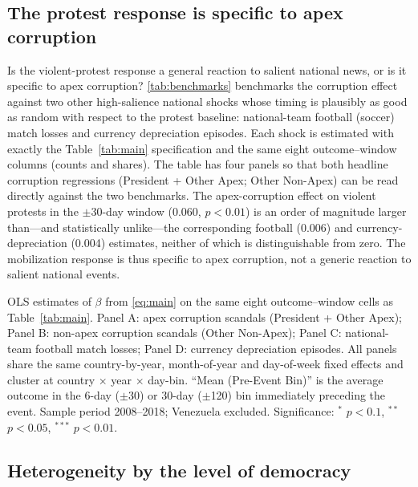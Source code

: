 \documentclass[11pt]{article}
\let\mathbetasym\beta
\renewcommand{\beta}{\ensuremath{\mathbetasym}}
\begin{document}
\subsection{The protest response is specific to apex corruption}

Is the violent-protest response a general reaction to salient national news, or is it specific to apex corruption? \autoref{tab:benchmarks} benchmarks the corruption effect against two other high-salience national shocks whose timing is plausibly as good as random with respect to the protest baseline: national-team football (soccer) match losses and currency depreciation episodes. Each shock is estimated with exactly the Table~\ref{tab:main} specification and the same eight outcome--window columns (counts and shares). The table has four panels so that both headline corruption regressions (President + Other Apex; Other Non-Apex) can be read directly against the two benchmarks. The apex-corruption effect on violent protests in the $\pm$30-day window (0.060, $p<0.01$) is an order of magnitude larger than---and statistically unlike---the corresponding football (0.006) and currency-depreciation (0.004) estimates, neither of which is distinguishable from zero. The mobilization response is thus specific to apex corruption, not a generic reaction to salient national events.

\begin{table}[htb!]
    \caption{Benchmarking the corruption effect against football losses and currency depreciations.}
    \label{tab:benchmarks}
    \begin{center}
        \scriptsize{}
    \end{center}
    \footnotesize{OLS estimates of $\beta$ from \autoref{eq:main} on the same eight outcome--window cells as Table~\ref{tab:main}. Panel A: apex corruption scandals (President + Other Apex); Panel B: non-apex corruption scandals (Other Non-Apex); Panel C: national-team football match losses; Panel D: currency depreciation episodes. All panels share the same country-by-year, month-of-year and day-of-week fixed effects and cluster at country $\times$ year $\times$ day-bin. ``Mean (Pre-Event Bin)'' is the average outcome in the 6-day ($\pm$30) or 30-day ($\pm$120) bin immediately preceding the event. Sample period 2008--2018; Venezuela excluded. Significance: $^{*}$ $p<0.1$, $^{**}$ $p<0.05$, $^{***}$ $p<0.01$.}
\end{table}

\subsection{Heterogeneity by the level of democracy}
\end{document}
